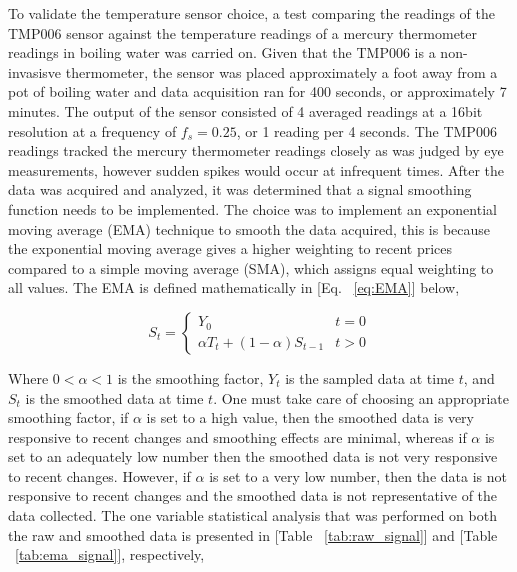 \indent\indent To validate the temperature sensor choice, a test comparing the readings of the TMP006 sensor against the temperature readings of a mercury thermometer readings in boiling water was carried on. Given that the TMP006 is a non-invasisve thermometer, the sensor was placed approximately a foot away from a pot of boiling water and data acquisition ran for 400 seconds, or approximately 7 minutes. The output of the sensor consisted of 4 averaged readings at a 16bit resolution at a frequency of $f_s=0.25$, or 1 reading per 4 seconds. The TMP006 readings tracked the mercury thermometer readings closely as was judged by eye measurements, however sudden spikes would occur at infrequent times.
After the data was acquired and analyzed, it was determined that a signal smoothing function needs to be implemented. The choice was to implement an exponential moving average (EMA) technique to smooth the data acquired, this is because the exponential moving average gives a higher weighting to recent prices compared to a simple moving average (SMA), which assigns equal weighting to all values. The EMA is defined mathematically in [Eq. ~\ref{eq:EMA}] below,

\begin{equation}
    S_t=
    \left\{ \begin{array}{ll}
        Y_0                             &   t = 0   \\
        \alpha T_t + (1-\alpha)S_{t-1}  &   t > 0   
    \end{array} \right.
    \label{eq:EMA}
\end{equation}

Where $0 < \alpha < 1$ is the smoothing factor, $Y_t$ is the sampled data at time $t$, and $S_t$ is the smoothed data at time $t$. One must take care of choosing an appropriate smoothing factor, if $\alpha$ is set to a high value, then the smoothed data is very responsive to recent changes and smoothing effects are minimal, whereas if $\alpha$ is set to an adequately low number then the smoothed data is not very responsive to recent changes. However, if $\alpha$ is set to a very low number, then the data is not responsive to recent changes and the smoothed data is not representative of the data collected. The one variable statistical analysis that was performed on both the raw and smoothed data is presented in [Table ~\ref{tab:raw_signal}] and [Table ~\ref{tab:ema_signal}], respectively,

